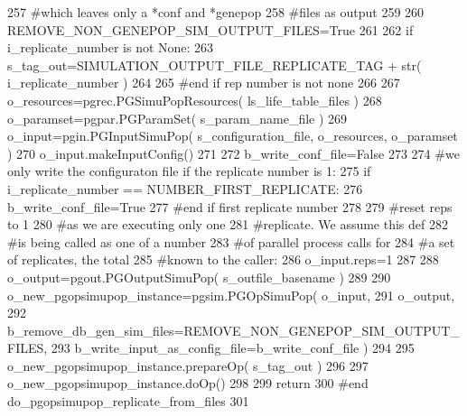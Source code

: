 \begin{DoxyCode}
257     \textcolor{comment}{#which leaves only a *conf and *genepop}
258     \textcolor{comment}{#files as output}
259 
260     REMOVE\_NON\_GENEPOP\_SIM\_OUTPUT\_FILES=\textcolor{keyword}{True}
261 
262     \textcolor{keywordflow}{if} i\_replicate\_number \textcolor{keywordflow}{is} \textcolor{keywordflow}{not} \textcolor{keywordtype}{None}:
263         s\_tag\_out=SIMULATION\_OUTPUT\_FILE\_REPLICATE\_TAG + str( i\_replicate\_number )
264 
265     \textcolor{comment}{#end if rep number is not none}
266 
267     o\_resources=pgrec.PGSimuPopResources( ls\_life\_table\_files )
268     o\_paramset=pgpar.PGParamSet( s\_param\_name\_file )
269     o\_input=pgin.PGInputSimuPop( s\_configuration\_file, o\_resources, o\_paramset ) 
270     o\_input.makeInputConfig()
271 
272     b\_write\_conf\_file=\textcolor{keyword}{False}
273 
274     \textcolor{comment}{#we only write the configuraton file if the replicate number is 1:}
275     \textcolor{keywordflow}{if} i\_replicate\_number == NUMBER\_FIRST\_REPLICATE:
276         b\_write\_conf\_file=\textcolor{keyword}{True}
277     \textcolor{comment}{#end if first replicate number}
278 
279     \textcolor{comment}{#reset reps to 1}
280     \textcolor{comment}{#as we are executing only one}
281     \textcolor{comment}{#replicate.  We assume this def}
282     \textcolor{comment}{#is being called as one of a number}
283     \textcolor{comment}{#of parallel process calls for}
284     \textcolor{comment}{#a set of replicates, the total }
285     \textcolor{comment}{#known to the caller:}
286     o\_input.reps=1
287 
288     o\_output=pgout.PGOutputSimuPop( s\_outfile\_basename )
289 
290     o\_new\_pgopsimupop\_instance=pgsim.PGOpSimuPop( o\_input,
291             o\_output, 
292             b\_remove\_db\_gen\_sim\_files=REMOVE\_NON\_GENEPOP\_SIM\_OUTPUT\_FILES,
293             b\_write\_input\_as\_config\_file=b\_write\_conf\_file )
294 
295     o\_new\_pgopsimupop\_instance.prepareOp( s\_tag\_out  )
296 
297     o\_new\_pgopsimupop\_instance.doOp()
298 
299     \textcolor{keywordflow}{return}
300 \textcolor{comment}{#end do\_pgopsimupop\_replicate\_from\_files}
301 
\end{DoxyCode}
